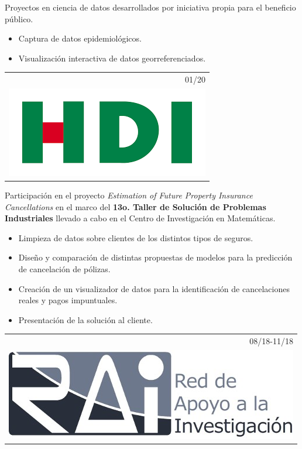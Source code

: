 \documentclass[]{friggeri-cv}
\begin{document}
\begin{entrylist}
{\begin{tabular}{r}
	\end{tabular}
    }
    {\vspace{-1.18cm}}
    { }
    {Proyectos en ciencia de datos desarrollados por iniciativa propia para el beneficio público.
    \begin{itemize}
    	\item Captura de datos epidemiológicos.
	\item Visualización interactiva de datos georreferenciados.
\end{itemize}}
\entry
   {   \begin{tabular}{r}
    		01/20\\
     		\hspace{0.87cm}\includegraphics[scale=0.15]{img/hdi.png}
	\end{tabular}
    }
    {\vspace{-0.91cm}}
    { }
    {Participación en el proyecto \textsl{Estimation of Future Property Insurance Cancellations} en el marco del \textbf{13o. Taller de Solución de Problemas Industriales} llevado a cabo en el Centro de Investigación en Matemáticas.
    \begin{itemize}
	\item Limpieza de datos sobre clientes de los distintos tipos de seguros.
	\item Diseño y comparación de distintas propuestas de modelos para la predicción de cancelación de pólizas.
	\item Creación de un visualizador de datos para la identificación de cancelaciones reales y pagos impuntuales.
	\item Presentación de la solución al cliente.
    \end{itemize}}
\entry
   {   \begin{tabular}{r}
    		08/18-11/18\\
     		\includegraphics[scale=0.15]{img/RAI.jpg}

\end{tabular}}
\end{entrylist}
\end{document}
